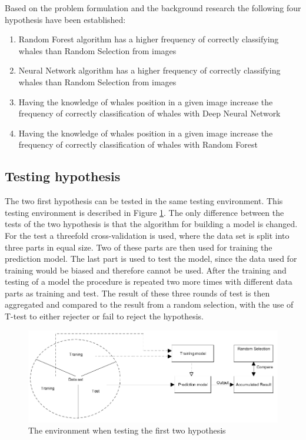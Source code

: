 Based on the problem formulation and the background research the following four hypothesis have been established:
\begin{enumerate}
	\item Random Forest algorithm has a higher frequency of correctly classifying whales than Random Selection from images
	\item Neural Network algorithm has a higher frequency of correctly classifying whales than Random Selection from images
	\item Having the knowledge of whales position in a given image increase the frequency of correctly classification of whales with Deep Neural Network
	\item Having the knowledge of whales position in a given image increase the frequency of correctly classification of whales with Random Forest
\end{enumerate}

\subsection{Testing hypothesis}
The two first hypothesis can be tested in the same testing environment. This testing environment is described in Figure \ref{fig:environmentRaw}. The only difference between the tests of the two hypothesis is that the algorithm for building a model is changed.
For the test a threefold cross-validation is used, where the data set is split into three parts in equal size. Two of these parts are then used for training the prediction model. The last part is used to test the model, since the data used for training would be biased and therefore cannot be used. After the training and testing of a model the procedure is repeated two more times with different data parts as training and test. 
The result of these three rounds of test is then aggregated and compared to the result from a random selection, with the use of T-test to either rejecter or fail to reject the hypothesis.

\begin{figure}
	\centering
	\includegraphics[width=\linewidth]{Images/EnvironmentOnRawData}
	\caption{The environment when testing the first two hypothesis}
	\label{fig:environmentRaw}
\end{figure}


